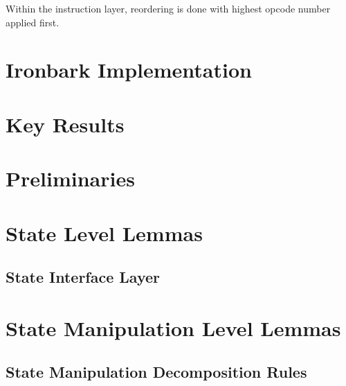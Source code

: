 \documentclass[11pt,a4paper]{article}
\begin{document}
Within the instruction layer, reordering is done with highest opcode number applied first.

\section{Ironbark Implementation}





\section{Key Results}




\appendix

\section{Preliminaries}


\section{State Level Lemmas}


\subsection{State Interface Layer}


\section{State Manipulation Level Lemmas}

\subsection{State Manipulation Decomposition Rules}





\end{document}
